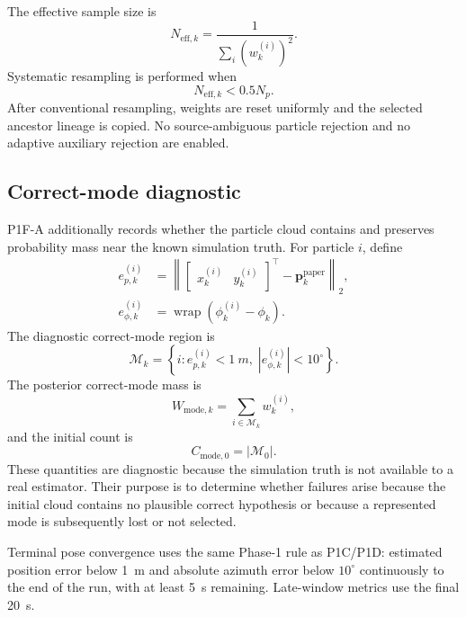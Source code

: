 The effective sample size is
\begin{equation}
    N_{\mathrm{eff},k}=\frac{1}{\sum_i(w_k^{(i)})^2}.
\end{equation}
Systematic resampling is performed when
\begin{equation}
    N_{\mathrm{eff},k}<0.5N_p.
\end{equation}
After conventional resampling, weights are reset uniformly and the selected ancestor lineage is copied. No source-ambiguous particle rejection and no adaptive auxiliary rejection are enabled.

\subsection{Correct-mode diagnostic}
P1F-A additionally records whether the particle cloud contains and preserves probability mass near the known simulation truth. For particle $i$, define
\begin{align}
    e_{p,k}^{(i)}
    &=\left\lVert
        \begin{bmatrix}x_k^{(i)}&y_k^{(i)}\end{bmatrix}^{\top}
        -\bm p_k^{\mathrm{paper}}
      \right\rVert_2,\\
    e_{\phi,k}^{(i)}
    &=\operatorname{wrap}(\phi_k^{(i)}-\phi_k).
\end{align}
The diagnostic correct-mode region is
\begin{equation}
    \mathcal M_k
    =\left\{i:
        e_{p,k}^{(i)}<\SI{1}{m},\;
        |e_{\phi,k}^{(i)}|<10^\circ
      \right\}.
\end{equation}
The posterior correct-mode mass is
\begin{equation}
    W_{\mathrm{mode},k}
    =\sum_{i\in\mathcal M_k}w_k^{(i)},
\end{equation}
and the initial count is
\begin{equation}
    C_{\mathrm{mode},0}=|\mathcal M_0|.
\end{equation}
These quantities are diagnostic because the simulation truth is not available to a real estimator. Their purpose is to determine whether failures arise because the initial cloud contains no plausible correct hypothesis or because a represented mode is subsequently lost or not selected.

Terminal pose convergence uses the same Phase-1 rule as P1C/P1D: estimated position error below \SI{1}{m} and absolute azimuth error below $10^\circ$ continuously to the end of the run, with at least \SI{5}{s} remaining. Late-window metrics use the final \SI{20}{s}.

